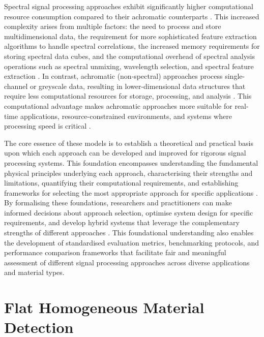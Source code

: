 \documentclass[12pt,a4paper,oneside]{report}
\let\oldchapter\chapter
\renewcommand{\chapter}{\thispagestyle{fancy}\oldchapter}
\begin{document}
Spectral signal processing approaches exhibit significantly higher computational resource consumption compared to their achromatic counterparts \cite{su2016,becker2023}. This increased complexity arises from multiple factors: the need to process and store multidimensional data, the requirement for more sophisticated feature extraction algorithms to handle spectral correlations, the increased memory requirements for storing spectral data cubes, and the computational overhead of spectral analysis operations such as spectral unmixing, wavelength selection, and spectral feature extraction \cite{heinz2001,vasile2023}. In contrast, achromatic (non-spectral) approaches process single-channel or greyscale data, resulting in lower-dimensional data structures that require less computational resources for storage, processing, and analysis \cite{su2016,becker2023}. This computational advantage makes achromatic approaches more suitable for real-time applications, resource-constrained environments, and systems where processing speed is critical \cite{moramartin2021,lyons2019}.

The core essence of these models is to establish a theoretical and practical basis upon which each approach can be developed and improved for rigorous signal processing systems. This foundation encompasses understanding the fundamental physical principles underlying each approach, characterising their strengths and limitations, quantifying their computational requirements, and establishing frameworks for selecting the most appropriate approach for specific applications \cite{koerner2021}. By formalising these foundations, researchers and practitioners can make informed decisions about approach selection, optimise system design for specific requirements, and develop hybrid systems that leverage the complementary strengths of different approaches \cite{moramartin2021,yang2023,yang2024}. This foundational understanding also enables the development of standardised evaluation metrics, benchmarking protocols, and performance comparison frameworks that facilitate fair and meaningful assessment of different signal processing approaches across diverse applications and material types.

\newpage
\chapter{Flat Homogeneous Material Detection}
\label{chap:flat_homogeneous_material_detection}

\newpage
\end{document}
